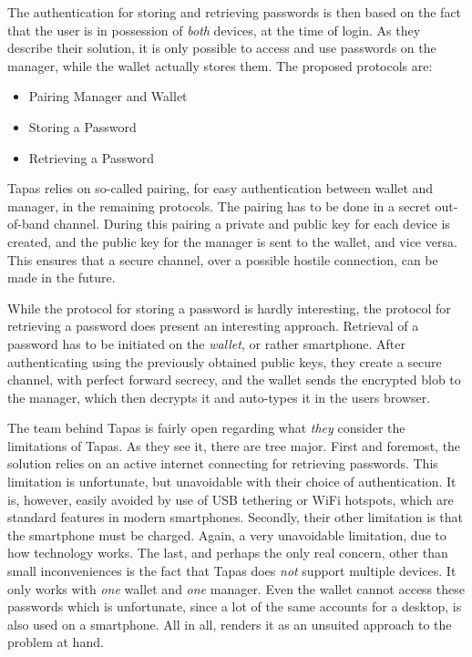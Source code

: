 			The authentication for storing and retrieving passwords is then based on the fact that the user is in possession of \emph{both} devices, at the time of login. As they describe their solution, it is only possible to access and use passwords on the manager, while the wallet actually stores them. The proposed protocols are:
			\begin{itemize}
				\item Pairing Manager and Wallet
				\item Storing a Password
				\item Retrieving a Password
			\end{itemize}

			Tapas relies on so-called pairing, for easy authentication between wallet and manager, in the remaining protocols. The pairing has to be done in a secret out-of-band channel. During this pairing a private and public key for each device is created, and the public key for the manager is sent to the wallet, and vice versa. This ensures that a secure channel, over a possible hostile connection, can be made in the future.

			While the protocol for storing a password is hardly interesting, the protocol for retrieving a password does present an interesting approach. Retrieval of a password has to be initiated on the \emph{wallet}, or rather smartphone. After authenticating using the previously obtained public keys, they create a secure channel, with perfect forward secrecy, and the wallet sends the encrypted blob to the manager, which then decrypts it and auto-types it in the users browser.

			The team behind Tapas is fairly open regarding what \emph{they} consider the limitations of Tapas. As they see it, there are tree major. First and foremost, the solution relies on an active internet connecting for retrieving passwords. This limitation is unfortunate, but unavoidable with their choice of authentication. It is, however, easily avoided by use of USB tethering or WiFi hotspots, which are standard features in modern smartphones. Secondly, their other limitation is that the smartphone must be charged. Again, a very unavoidable limitation, due to how technology works. The last, and perhaps the only real concern, other than small inconveniences is the fact that Tapas does \emph{not} support multiple devices. It only works with \emph{one} wallet and  \emph{one} manager. Even the wallet cannot access these passwords which is unfortunate, since a lot of the same accounts for a desktop, is also used on a smartphone. All in all, renders it as an unsuited approach to the problem at hand.

